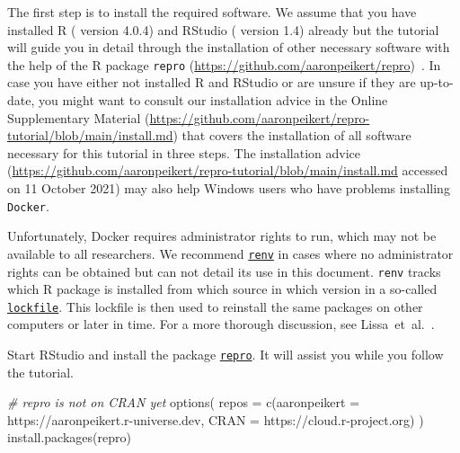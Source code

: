 \documentclass[psych,tutorial,accept,moreauthors,pdftex]{Definitions/mdpi}
\newenvironment{Shaded}{\begin{snugshade}}{\end{snugshade}}
\newcommand{\AttributeTok}[1]{\textcolor[rgb]{0.77,0.63,0.00}{#1}}
\newcommand{\CommentTok}[1]{\textcolor[rgb]{0.56,0.35,0.01}{\textit{#1}}}
\newcommand{\FunctionTok}[1]{\textcolor[rgb]{0.00,0.00,0.00}{#1}}
\newcommand{\NormalTok}[1]{#1}
\newcommand{\StringTok}[1]{\textcolor[rgb]{0.31,0.60,0.02}{#1}}
\begin{document}
The first step is to install the required software. We assume that you
have installed R (\citep{R-base} version 4.0.4) and RStudio
(\citep{rstudio} version 1.4) already but the tutorial will guide you in
detail through the installation of other necessary software with the
help of the R package {\texttt{repro}} 
(\url{https://github.com/aaronpeikert/repro})~\citep{R-repro}. In case you have either not installed R and RStudio or
are unsure if they are up-to-date, you might want to consult our
installation advice in the Online Supplementary Material
(\url{https://github.com/aaronpeikert/repro-tutorial/blob/main/install.md}) that covers the installation of all software
necessary for this tutorial in three steps. The
{installation advice}
(\url{https://github.com/aaronpeikert/repro-tutorial/blob/main/install.md} accessed on 11 October 2021) may also help Windows users who have problems installing
\texttt{Docker}.

Unfortunately, Docker requires administrator rights to run, which may
not be available to all researchers. We recommend
\href{https://rstudio.github.io/renv/articles/renv.html}{\texttt{renv}}
\citep{R-renv} in cases where no administrator rights can be obtained
but can not detail its use in this document. \texttt{renv} tracks which
R package is installed from which source in which version in a so-called
\href{https://rstudio.github.io/renv/articles/lockfile.html}{\texttt{lockfile}}.
This lockfile is then used to reinstall the same packages on other
computers or later in time. For a more thorough discussion, see
Lissa~et~al.~\citep{vanlissa2020worcs}.

Start RStudio and install the package
\href{https://github.com/aaronpeikert}{\texttt{repro}}\citep{R-repro}.
It will assist you while you follow the tutorial.

\begin{adjustwidth}{0.5cm}{0cm} 
\begin{Shaded}
\begin{Highlighting}[]
\CommentTok{\# repro is not on CRAN yet}
\FunctionTok{options}\NormalTok{(}
  \AttributeTok{repos =} \FunctionTok{c}\NormalTok{(}\AttributeTok{aaronpeikert =} \StringTok{\textquotesingle{}https://aaronpeikert.r{-}universe.dev\textquotesingle{}}\NormalTok{,}
            \AttributeTok{CRAN =} \StringTok{\textquotesingle{}https://cloud.r{-}project.org\textquotesingle{}}\NormalTok{)}
\NormalTok{)}
\FunctionTok{install.packages}\NormalTok{(}\StringTok{\textquotesingle{}repro\textquotesingle{}}\NormalTok{)}
\end{Highlighting}
\end{Shaded}
\end{adjustwidth}
\end{document}
